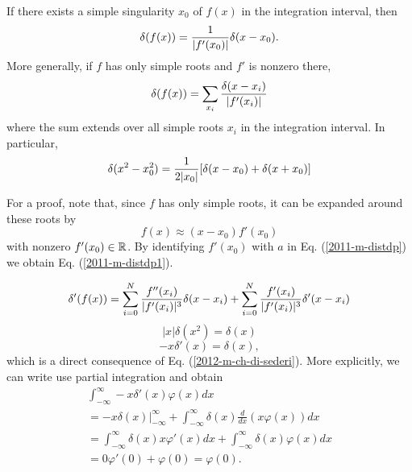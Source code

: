 If there exists a simple singularity $x_0$ of $f(x)$ in the
integration interval, then
\begin{equation}
 \delta (f(x))={1\over \vert f'(x_0)\vert }\delta(x-x_0)
.
 \end{equation}
More generally,  if $f$ has only simple roots and $f'$ is nonzero there,
\begin{equation}
 \delta (f(x))=\sum_{x_i}{\delta(x-x_i)\over \vert f'(x_i)\vert }
\label{2011-m-distdp1}
 \end{equation}
where the sum extends over all simple roots $x_i$ in
the integration interval.
In particular,
 \begin{equation}
 \delta (x^2-x_0^2)={1\over 2\vert x_0\vert }[\delta (x-x_0)+\delta
 (x+x_0)] \end{equation}
{\color{OliveGreen}
\bproof
For a proof, note that, since $f$ has only simple roots,
it can be expanded around these roots by
$$
f(x) \approx (x-x_0) f'(x_0)
$$
with nonzero $f'(x_0) \in {\Bbb R}$.
By identifying  $f'(x_0)$ with $a$ in
Eq. (\ref{2011-m-distdp})
we obtain
Eq. (\ref{2011-m-distdp1}).

\eproof
}


 \begin{equation}
 \delta '(f(x))=
\sum_{i=0}^N
{f'' (x_i)\over \vert f'(x_i)\vert ^3}
\delta (x-x_i) +
\sum_{i=0}^N
{f' (x_i)\over \vert f'(x_i)\vert ^3}
\delta ' (x-x_i)
 \end{equation}
 \begin{equation}
 \vert x\vert \delta (x^2)=\delta (x)
 \end{equation}
 \begin{equation}
 -x\delta '(x)=\delta (x),
 \end{equation}
which is a direct consequence of Eq. (\ref{2012-m-ch-di-sederi}).
{\color{OliveGreen}
\bproof
More explicitly, we can write use partial integration and obtain
 \begin{equation}
 \begin{split}
\int _{-\infty}^\infty -x \delta' (x)  \varphi (x)  dx  \\
 =  - \left. x \delta (x)\right|_{-\infty}^\infty  + \int _{-\infty}^\infty \delta (x)
\frac{d}{dx}\left(x \varphi (x)\right)dx\\
 =
\int _{-\infty}^\infty \delta (x)
x \varphi' (x)  dx
+
\int _{-\infty}^\infty \delta (x)
\varphi (x) dx\\
 =
0 \varphi' (0)  +
\varphi (0)= \varphi (0).
 \end{split}
 \end{equation}
\eproof
}

